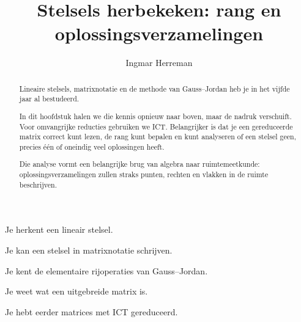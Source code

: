 \documentclass{ximera}
\title{Stelsels herbekeken: rang en oplossingsverzamelingen}
\author{Ingmar Herreman}
\begin{document}









\begin{abstract}
Lineaire stelsels, matrixnotatie en de methode van Gauss--Jordan
heb je in het vijfde jaar al bestudeerd.

In dit hoofdstuk halen we die kennis opnieuw naar boven, maar de nadruk
verschuift. Voor omvangrijke reducties gebruiken we ICT. Belangrijker is
dat je een gereduceerde matrix correct kunt lezen, de rang kunt bepalen
en kunt analyseren of een stelsel geen, precies één of oneindig veel
oplossingen heeft.

Die analyse vormt een belangrijke brug van algebra naar ruimtemeetkunde:
oplossingsverzamelingen zullen straks punten, rechten en vlakken in de
ruimte beschrijven.
\end{abstract}

\maketitle



\begin{voorkennis}
  \item Je herkent een lineair stelsel.
  \item Je kan een stelsel in matrixnotatie schrijven.
  \item Je kent de elementaire rijoperaties van Gauss--Jordan.
  \item Je weet wat een uitgebreide matrix is.
  \item Je hebt eerder matrices met ICT gereduceerd.
\end{voorkennis}
\end{document}
